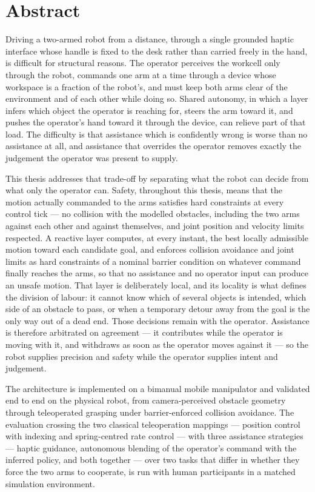 \chapter{Abstract}

\noindent Driving a two-armed robot from a distance, through a single grounded haptic interface whose handle is fixed to the desk rather than carried freely in the hand, is difficult for structural reasons. The operator perceives the workcell only through the robot, commands one arm at a time through a device whose workspace is a fraction of the robot's, and must keep both arms clear of the environment and of each other while doing so. Shared autonomy, in which a layer infers which object the operator is reaching for, steers the arm toward it, and pushes the operator's hand toward it through the device, can relieve part of that load. The difficulty is that assistance which is confidently wrong is worse than no assistance at all, and assistance that overrides the operator removes exactly the judgement the operator was present to supply.

This thesis addresses that trade-off by separating what the robot can decide from what only the operator can. Safety, throughout this thesis, means that the motion actually commanded to the arms satisfies hard constraints at every control tick --- no collision with the modelled obstacles, including the two arms against each other and against themselves, and joint position and velocity limits respected. A reactive layer computes, at every instant, the best locally admissible motion toward each candidate goal, and enforces collision avoidance and joint limits as hard constraints of a nominal barrier condition on whatever command finally reaches the arms, so that no assistance and no operator input can produce an unsafe motion. That layer is deliberately local, and its locality is what defines the division of labour: it cannot know which of several objects is intended, which side of an obstacle to pass, or when a temporary detour away from the goal is the only way out of a dead end. Those decisions remain with the operator. Assistance is therefore arbitrated on agreement --- it contributes while the operator is moving with it, and withdraws as soon as the operator moves against it --- so the robot supplies precision and safety while the operator supplies intent and judgement.

The architecture is implemented on a bimanual mobile manipulator and validated end to end on the physical robot, from camera-perceived obstacle geometry through teleoperated grasping under barrier-enforced collision avoidance. The evaluation crossing the two classical teleoperation mappings --- position control with indexing and spring-centred rate control --- with three assistance strategies --- haptic guidance, autonomous blending of the operator's command with the inferred policy, and both together --- over two tasks that differ in whether they force the two arms to cooperate, is run with human participants in a matched simulation environment.

